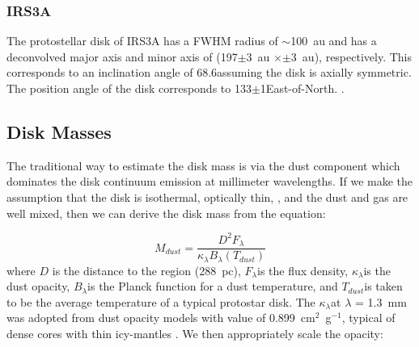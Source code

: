 \documentclass[twocolumn, 12pt,trackchanges]{aastex63}
\renewcommand{\deg}{\degr}
\newcommand{\ab}{$\sim$}
\begin{document}
\subsubsection{IRS3A}
The protostellar disk of IRS3A has a FWHM radius of \ab100~au and has a deconvolved major axis and minor axis of \space(197$\pm$3~au $\times$$\pm$3~au), respectively. This corresponds to an inclination angle of 68.6\deg\space assuming the disk is axially symmetric. The position angle of the disk corresponds to 133$\pm$1\deg\space East-of-North. .

\subsection{Disk Masses}\label{sec:diskmass}
The traditional way to estimate the disk mass is via the dust component which dominates the disk continuum emission at millimeter wavelengths. If we make the assumption that the disk is isothermal, optically thin, , and the dust and gas are well mixed, then we can derive the disk mass from the equation:

\begin{equation}\label{eq:dustmasseq}
    M_{dust} = \frac{D^2 F_{\lambda}}{\kappa_{\lambda}B_{\lambda}(T_{dust})}
\end{equation}
where $D$ is the distance to the region (288~pc), $F_{\lambda}$\space is the flux density, $\kappa_{\lambda}$\space is the dust opacity, $B_{\lambda}$\space is the Planck function for a dust temperature, and $T_{dust}$\space is taken to be the average temperature of a typical protostar disk. The $\kappa_{\lambda}$\space at $\lambda$ = 1.3~mm was adopted from dust opacity models with value of 0.899~cm$^2$~g$^{-1}$, typical of dense cores with thin icy-mantles \citep{1994AA...291..943O}. We then appropriately scale the opacity:
\end{document}
